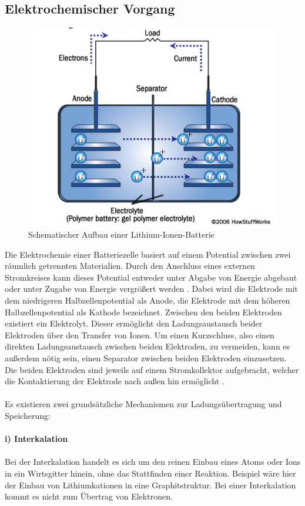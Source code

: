 \documentclass[a4paper, 11pt, headsepline,footsepline,twoside,abstract]{scrbook}
\begin{document}
\subsection{Elektrochemischer Vorgang}
\begin{figure}
	\centering
	\includegraphics[width=0.6\columnwidth]{images/Schematischer_Aufbau_Li_Ionen.png}
	\caption{Schematischer Aufbau einer Lithium-Ionen-Batterie \cite{howstuffworks}}
	\label{schema_li_ionen}
\end{figure}
Die Elektrochemie einer Batteriezelle basiert auf einem Potential zwischen zwei räumlich getrennten Materialien. Durch den Anschluss eines externen Stromkreises kann dieses Potential entweder unter Abgabe von Energie abgebaut oder unter Zugabe von Energie vergrößert werden \cite{mortimer}. Dabei wird die Elektrode mit dem niedrigeren Halbzellenpotential als Anode, die Elektrode mit dem höheren Halbzellenpotential als Kathode bezeichnet. Zwischen den beiden Elektroden existiert ein Elektrolyt. Dieser ermöglicht den Ladungsaustausch beider Elektroden über den Transfer von Ionen. Um einen Kurzschluss, also einen direkten Ladungsaustausch zwischen beiden Elektroden, zu vermeiden, kann es außerdem nötig sein, einen Separator zwischen beiden Elektroden einzusetzen. Die beiden Elektroden sind jeweils auf einem Stromkollektor aufgebracht, welcher die Kontaktierung der Elektrode nach außen hin ermöglicht \cite{korthauer2013}.
\\\\
Es existieren zwei grundsätzliche Mechanismen zur Ladungsübertragung und Speicherung:
\\\\ %
\textbf{i) Interkalation}
\\\\
Bei der Interkalation handelt es sich um den reinen Einbau eines Atoms oder Ions in ein Wirtsgitter hinein, ohne das Stattfinden einer Reaktion. Beispiel wäre hier der Einbau von Lithiumkationen in eine Graphitstruktur. Bei einer Interkalation kommt es nicht zum Übertrag von Elektronen.
\end{document}
